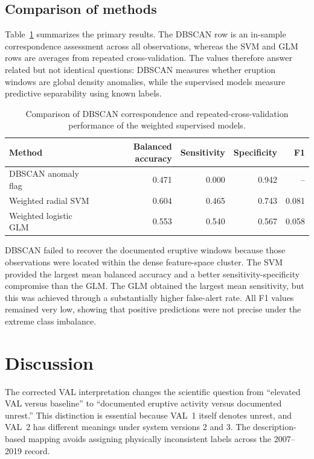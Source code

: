 \documentclass[11pt]{article}
\begin{document}
\subsection{Comparison of methods}

Table~\ref{tab:model-comparison} summarizes the primary results. The DBSCAN row is an in-sample correspondence assessment across all observations, whereas the SVM and GLM rows are averages from repeated cross-validation. The values therefore answer related but not identical questions: DBSCAN measures whether eruption windows are global density anomalies, while the supervised models measure predictive separability using known labels.

\begin{table}[H]
	\centering
	\caption{Comparison of DBSCAN correspondence and repeated-cross-validation
		performance of the weighted supervised models.}
	\label{tab:model-comparison}
	\begin{tabular}{lrrrr}
		\toprule
		Method & Balanced accuracy & Sensitivity & Specificity & F1 \\
		\midrule
		DBSCAN anomaly flag & 0.471 & 0.000 & 0.942 & -- \\
		Weighted radial SVM & 0.604 & 0.465 & 0.743 & 0.081 \\
		Weighted logistic GLM & 0.553 & 0.540 & 0.567 & 0.058 \\
		\bottomrule
	\end{tabular}
\end{table}

DBSCAN failed to recover the documented eruptive windows because those observations were located within the dense feature-space cluster. The SVM provided the largest mean balanced accuracy and a better sensitivity-specificity compromise than the GLM. The GLM obtained the largest mean sensitivity, but this was achieved through a substantially higher false-alert
rate. All F1 values remained very low, showing that positive predictions were not precise under the extreme class imbalance.

\section{Discussion}

The corrected VAL interpretation changes the scientific question from ``elevated VAL versus baseline'' to ``documented eruptive activity versus documented unrest.'' This distinction is essential because VAL~1 itself denotes unrest, and VAL~2 has different meanings under system versions 2 and 3. The description-based mapping avoids assigning physically inconsistent
labels across the 2007--2019 record.
\end{document}
